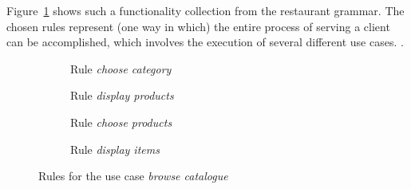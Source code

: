 \begin{example} Figure~\ref{fig:tests:grammar} shows such a functionality collection from the restaurant grammar. The chosen rules represent (one way in which) the entire process of serving a client can be accomplished, which involves the execution of several different use cases. . 

\begin{figure}[!]
  \centering
  \begin{subfigure}[t]{.5\textwidth}
    \centerline{}
    \caption{Rule \emph{choose category}}
  \end{subfigure}
  \begin{subfigure}[t]{.5\textwidth}
    \centerline{}
    \caption{Rule \emph{display products}}
  \end{subfigure}
  \begin{subfigure}[t]{.5\textwidth}
    \centerline{}
    \caption{Rule \emph{choose products}}
  \end{subfigure}
  \begin{subfigure}[t]{.5\textwidth}
    \centerline{}
    \caption{Rule \emph{display items}}
  \end{subfigure}
  \caption{Rules for the use case \emph{browse catalogue}}\label{fig:tests:grammar}
\end{figure}


\end{example}
